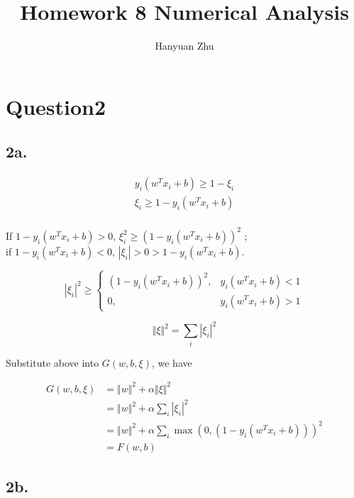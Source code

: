 \documentclass{article}
\title{Homework 8 Numerical Analysis}
\author{Hanyuan Zhu}
\date{}
\begin{document}
\section*{Question2}


\subsection*{2a. }

\begin{equation}
  \begin{split}
    y_i (w^T x_i + b) \geq 1 - \xi_i\\
    \xi_i \geq 1 - y_i (w^T x_i + b)\\
  \end{split}
\end{equation}

If $1 - y_i (w^T x_i + b) > 0 $, $\xi_i^2 \geq (1 - y_i (w^T x_i + b))^2 $ ;\\
if $1 - y_i (w^T x_i + b) < 0 $, $ |\xi_i| > 0 >  1 - y_i (w^T x_i + b) $.

\begin{equation}
  |\xi_i|^2 \geq
  \begin{cases}
    (1 - y_i (w^T x_i + b))^2, &  y_i (w^T x_i + b) < 1 \\
    0 , & y_i (w^T x_i + b)>1
  \end{cases}
\end{equation}

$$ \Vert \xi \Vert^2 = \sum_i|\xi_i|^2  $$

Substitute above into $G(w, b, \xi)$, we have

\begin{equation}
  \begin{split}
    G(w, b, \xi) &= \Vert w \Vert^2 + \alpha  \Vert \xi \Vert^2\\
    &= \Vert w \Vert^2 + \alpha \sum_i|\xi_i|^2\\
    &= \Vert w \Vert^2 + \alpha \sum_i \max(0,(1 - y_i (w^T x_i + b)))^2\\
    &= F(w, b)
  \end{split}
\end{equation}

\subsection*{2b. }
\end{document}
